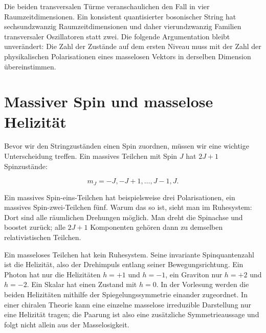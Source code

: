 Die beiden transversalen Türme veranschaulichen den Fall in vier Raumzeitdimensionen. Ein konsistent quantisierter bosonischer String hat sechsundzwanzig Raumzeitdimensionen und daher vierundzwanzig Familien transversaler Oszillatoren statt zwei. Die folgende Argumentation bleibt unverändert: Die Zahl der Zustände auf dem ersten Niveau muss mit der Zahl der physikalischen Polarisationen eines masselosen Vektors in derselben Dimension übereinstimmen.

\section{Massiver Spin und masselose Helizität}

Bevor wir den Stringzuständen einen Spin zuordnen, müssen wir eine wichtige Unterscheidung treffen. Ein massives Teilchen mit Spin \(J\) hat \(2J+1\) Spinzustände:

\begin{equation}
  m_J=-J,-J+1,\ldots,J-1,J.
  \label{eq:l03-massive-spin-multiplet}
\end{equation}

Ein massives Spin-eins-Teilchen hat beispielsweise drei Polarisationen, ein massives Spin-zwei-Teilchen fünf. Warum das so ist, sieht man im Ruhesystem: Dort sind alle räumlichen Drehungen möglich. Man dreht die Spinachse und boostet zurück; alle \(2J+1\) Komponenten gehören dann zu demselben relativistischen Teilchen.

Ein masseloses Teilchen hat kein Ruhesystem. Seine invariante Spinquantenzahl ist die Helizität, also der Drehimpuls entlang seiner Bewegungsrichtung. Ein Photon hat nur die Helizitäten \(h=+1\) und \(h=-1\), ein Graviton nur \(h=+2\) und \(h=-2\). Ein Skalar hat einen Zustand mit \(h=0\). In der Vorlesung werden die beiden Helizitäten mithilfe der Spiegelungssymmetrie einander zugeordnet. In einer chiralen Theorie kann eine einzelne masselose irreduzible Darstellung nur eine Helizität tragen; die Paarung ist also eine zusätzliche Symmetrieaussage und folgt nicht allein aus der Masselosigkeit.

